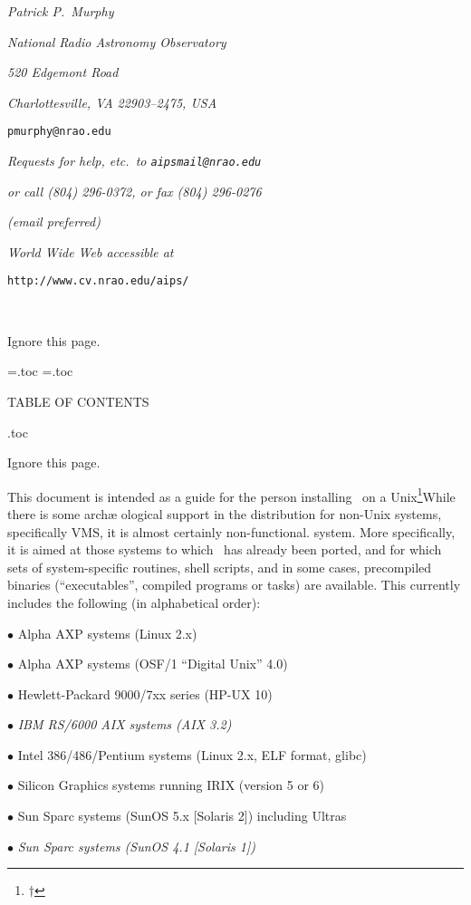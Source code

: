 \centerline{\it Patrick P.~Murphy}
\centerline{\it National Radio Astronomy Observatory}
\centerline{\it 520 Edgemont Road}
\centerline{\it Charlottesville, VA 22903--2475, USA}\smallskip
\centerline{\tt pmurphy@nrao.edu}\bigskip\bigskip
\medskip
\centerline{\it Requests for help, etc.~to \/ \tt aipsmail@nrao.edu}
\centerline{\it or call (804) 296-0372, or fax (804) 296-0276}
\centerline{\it (email preferred)}
\medskip
\centerline{\sl World Wide Web accessible at}
\centerline{\tt http://www.cv.nrao.edu/aips/}
\vfill\eject %
\ \vskip 4cm \centerline{Ignore this page.}
\vfill\eject %
\newread\testfile
\newwrite\contfile
\openin\testfile=\jobname.toc
 \ifeof\testfile{}
  \closein\testfile
   
  \immediate\openout\contfile=\jobname.toc \else \closein\testfile
    \
  \bigskip\centerline{\nraofont TABLE OF CONTENTS}\bigskip
  \jobname.toc
  \vfill\eject %
  \ \vskip 4cm \centerline{Ignore this page.}
 \fi
\vfill\eject
\pageno=1


This document is intended as a guide for the person installing
\AIPS\ on a Unix\footnote{$\dag$}{\eightrm While there is some arch\ae
                                  ological support in the distribution
                                  for non-Unix systems, specifically
                                  VMS, it is almost certainly
                                  non-functional.}
system.  More specifically, it is aimed at those systems to which
\AIPS\ has already been ported, and for which sets of system-specific
routines, shell scripts, and in some cases, precompiled binaries
(``executables'', compiled programs or tasks) are available.  This
currently includes the following (in alphabetical order):\medskip

\item{$\bullet$} Alpha AXP systems (Linux 2.x)
\item{$\bullet$} Alpha AXP systems (OSF/1 ``Digital Unix'' 4.0)
\item{$\bullet$} Hewlett-Packard 9000/7xx series (HP-UX 10)
\item{$\bullet$} {\it IBM RS/6000 AIX systems (AIX 3.2)\/}
\item{$\bullet$} Intel 386/486/Pentium systems (Linux 2.x, ELF format,
		 glibc)
\item{$\bullet$} Silicon Graphics systems running IRIX (version 5 or 6)
\item{$\bullet$} Sun Sparc systems (SunOS 5.x [Solaris 2]) including
                 Ultras
\item{$\bullet$} {\it Sun Sparc systems (SunOS 4.1 [Solaris 1])\/}
\medskip

